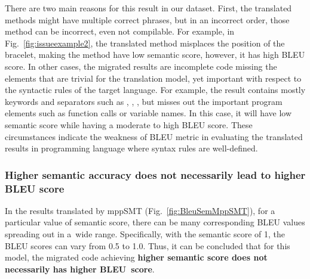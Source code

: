 There are two main reasons for this result in our dataset.  First, the
translated methods might have multiple correct phrases, but in an
incorrect order, those method can be incorrect, even not compilable.
%
For example, in Fig.~\ref{fig:issueexample2}, the translated method
misplaces the position of the bracelet, making the method have low
semantic score, however, it has high BLEU score.
%
In other cases, the migrated results are incomplete code missing the
elements that are trivial for the translation model, yet important
with respect to the syntactic rules of the target language. For
example, the result contains mostly keywords and separators such as
, , \code{()}, but misses out the important
program elements such as function calls or variable names. In this
case, it will have low semantic score while having a moderate to high
BLEU score. These circumstances indicate the weakness of BLEU metric
in evaluating the translated results in programming language where
syntax rules are well-defined.


\subsubsection{{\bf Higher semantic accuracy does not necessarily lead to
higher BLEU score}} In the results translated by mppSMT
(Fig.~\ref{fig:BleuSemMppSMT}), for a particular value of semantic
score, there can be many corresponding BLEU values spreading out in
a~wide range. Specifically, with the semantic score of 1, the BLEU
scores can vary from 0.5 to 1.0. Thus, it can be concluded
that for this model, the migrated code achieving {\bf higher semantic score does not necessarily has higher BLEU~score}.

